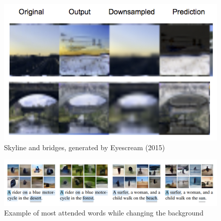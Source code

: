 \begin{figure}
    \includegraphics[width=\linewidth]{00_Introduction/eyescream_predicted16.png}
    \caption{Skyline and bridges, generated by Eyescream (2015)}
    \label{fig:eyescream}
\end{figure}

\begin{figure}
    \includegraphics[width=\linewidth]{00_Introduction/gen_from_captions.png}
    \caption{Example of most attended words while changing the background}
    \label{fig:gen_attention}
\end{figure}

